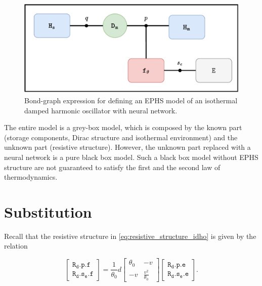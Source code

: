 \documentclass[
	parskip, 			   %
	twoside, 			   %
	DIV=14, 			   %
	BCOR=15.0mm, 		   %
	headsepline, 		   %
	open=right, 		   %
	captions=tableheading, %
	bibliography=totoc,    %
	numbers=noenddot       %
]{scrreprt}
\begin{document}
\clearpage
\begin{figure}[h!]
    \centering
    \includegraphics[scale=0.6]{figures/bondgraph_idho_exergetic_NN.pdf}
    \caption{Bond-graph expression for defining an EPHS model of an isothermal damped harmonic oscillator with neural network.}
    \label{fig:bondgraph_idho_exergetic_NN}
\end{figure}

The entire model is a grey-box model, which is composed by the known part (storage components, Dirac structure and isothermal environment) and the unknown part (resistive structure). However, the unknown part replaced with a neural network is a pure black box model. Such a black box model without EPHS structure are not guaranteed to satisfy the first and the second law of thermodynamics.


\section{Substitution}

Recall that the resistive structure in \ref{eq:resistive_structure_idho} is given by the relation

\begin{equation}
    \label{eq:resistive_structure_interconnection_idho}
    \left[\begin{array}{l}\mathtt{R_{d}.p.f} \\ \mathtt{R_{d}.s_{e}.f}\end{array}\right]=\frac{1}{\theta_0} d\left[\begin{array}{rr}\theta_0 & -v \\ -v & \frac{v^2}{\theta_0}\end{array}\right]\left[\begin{array}{l}\mathtt{R_{d}.p.e} \\ \mathtt{R_{d}.s_{e}.e}\end{array}\right].
\end{equation}
\end{document}
